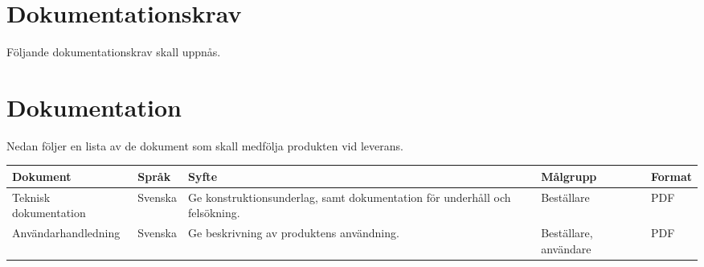 \documentclass[kravspec/krav.tex]{subfiles}
\begin{document}
\section{Dokumentationskrav}
\label{sec:doc}
Följande dokumentationskrav skall uppnås.
\begin{reqlist}
\end{reqlist}

\newpage

\section{Dokumentation}
\label{sec:doc}
Nedan följer en lista av de dokument som skall medfölja produkten vid leverans.
{\renewcommand{\arraystretch}{1.6}
\begin{longtable}{p{4.5cm}p{1.5cm}p{5cm}p{2cm}p{1.2cm}}
    \bfseries Dokument &
    \bfseries Språk &
    \bfseries Syfte &
    \bfseries Målgrupp &
    \bfseries Format \\\hline
    Teknisk dokumentation &
    Svenska &
    Ge konstruktionsunderlag, samt dokumentation för underhåll och
    felsökning. &
    Beställare &
    PDF
    \\
    Användarhandledning &
    Svenska &
    Ge beskrivning av produktens användning. &
    Beställare, användare &
    PDF
    \endhead
\end{longtable}
}
\end{document}
